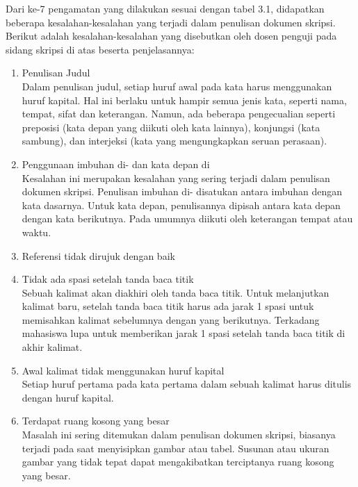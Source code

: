 Dari ke-7 pengamatan yang dilakukan sesuai dengan tabel 3.1, didapatkan beberapa kesalahan-kesalahan yang terjadi dalam penulisan dokumen skripsi. Berikut adalah kesalahan-kesalahan yang disebutkan oleh dosen penguji pada sidang skripsi di atas beserta penjelasannya:

\begin{enumerate}
	\item Penulisan Judul \\
	Dalam penulisan judul, setiap huruf awal pada kata harus menggunakan huruf kapital. Hal ini berlaku untuk hampir semua jenis kata, seperti nama, tempat, sifat dan keterangan. Namun, ada beberapa pengecualian seperti preposisi (kata depan yang diikuti oleh kata lainnya), konjungsi (kata sambung), dan interjeksi (kata yang mengungkapkan seruan perasaan).
	
	\item Penggunaan imbuhan di- dan kata depan di\\
	Kesalahan ini merupakan kesalahan yang sering terjadi dalam penulisan dokumen skripsi. Penulisan imbuhan di- disatukan antara imbuhan dengan kata dasarnya. Untuk kata depan, penulisannya dipisah antara kata depan dengan kata berikutnya. Pada umumnya diikuti oleh keterangan tempat atau waktu.
	
	\item Referensi tidak dirujuk dengan baik \\
	
	\item Tidak ada spasi setelah tanda baca titik \\
	Sebuah kalimat akan diakhiri oleh tanda baca titik. Untuk melanjutkan kalimat baru, setelah tanda baca titik harus ada jarak 1 spasi untuk memisahkan kalimat sebelumnya dengan yang berikutnya. Terkadang mahasiswa lupa untuk memberikan jarak 1 spasi setelah tanda baca titik di akhir kalimat.

	\item Awal kalimat tidak menggunakan huruf kapital \\
	Setiap huruf pertama pada kata pertama dalam sebuah kalimat harus ditulis dengan huruf kapital. 	
	
	\item Terdapat ruang kosong yang besar \\
	Masalah ini sering ditemukan dalam penulisan dokumen skripsi, biasanya terjadi pada saat menyisipkan gambar atau tabel. Susunan atau ukuran gambar yang tidak tepat dapat mengakibatkan terciptanya ruang kosong yang besar.


\end{enumerate}
